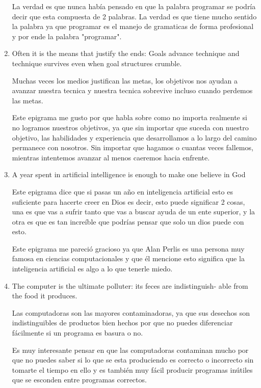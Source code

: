 \documentclass{article}
\begin{document}
\begin{enumerate}
    La verdad es que nunca había pensado en que la palabra programar se podría decir que  esta compuesta de 2 palabras. La verdad es que tiene mucho sentido la palabra ya que programar es el manejo de gramaticas de forma profesional y por ende la palabra "programar".

    \item Often it is the means that justify the ends: Goals advance technique and technique survives
    even when goal structures crumble.

    Muchas veces los medios justifican las metas, los objetivos nos ayudan a avanzar nuestra tecnica y nuestra tecnica sobrevive incluso cuando perdemos las metas.

    Este epigrama me gusto por que habla sobre como no importa realmente si no logramos nuestros objetivos, ya que sin importar que suceda con nuestro objetivo, las habilidades y experiencia que desarrollamos a lo largo del camino permanece con nosotros. Sin importar que hagamos o cuantas veces fallemos, mientras intentemos avanzar al menos caeremos hacia enfrente.
    
    \item A year spent in artificial intelligence is enough to make one believe in God

    Este epigrama dice que si pasas un año en inteligencia artificial esto es suficiente para hacerte creer en Dios es decir, esto puede significar 2 cosas, una es que vas a sufrir tanto que vas a buscar ayuda de un ente superior, y la otra es que es tan increíble que podrías pensar que solo un dios puede con esto.

    Este epigrama me pareció gracioso ya que Alan Perlis es una persona muy famosa en ciencias computacionales y que él mencione esto significa que la inteligencia artificial es algo a lo que tenerle miedo.
    
    \item The computer is the ultimate polluter: its feces are indistinguish- able from the food it
    produces.

    Las computadoras son las mayores contaminadoras, ya que sus desechos son indistinguibles de productos bien hechos por que no puedes diferenciar fácilmente si un programa es basura o no.

    Es muy interesante pensar en que las computadoras contaminan mucho por que no puedes saber si lo que se esta produciendo es correcto o incorrecto sin tomarte el tiempo en ello y es también muy fácil producir programas inútiles que se esconden entre programas correctos.
    

\end{enumerate}
\end{document}
